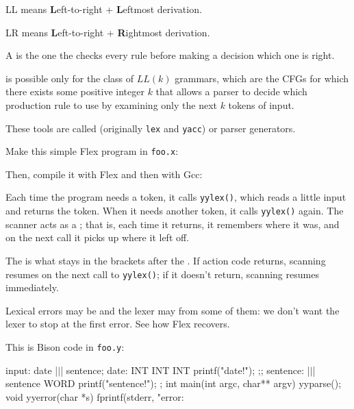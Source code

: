 \documentclass{article}
\begin{document}
LL means \textbf{L}eft-to-right + \textbf{L}eftmost derivation.

LR means \textbf{L}eft-to-right + \textbf{R}ightmost derivation.
\plush{}


A  is the one the checks every rule before making a decision which one is right.

 is possible only for the class of \(LL(k)\) grammars, which are the CFGs for which there exists some positive integer \(k\) that allows a parser to decide which production rule to use by examining only the next \(k\) tokens of input.
\plush{}


These tools are called  (originally \texttt{lex} and \texttt{yacc}) or parser generators.

Make this simple Flex program in \texttt{foo.x}:
Then, compile it with Flex and then with Gcc:
\plush{}

Each time the program needs a token, it calls \texttt{yylex()}, which reads a little input and returns the token. When it needs another token, it calls \texttt{yylex()} again. The scanner acts as a ; that is, each time it returns, it remembers where it was, and on the next call it picks up where it left off.
\plush{}

The  is what stays in the brackets after the . If action code returns, scanning resumes on the next call to \texttt{yylex()}; if it doesn't return, scanning resumes immediately.
\plush{}

Lexical errors may be  and the lexer may  from some of them: we don't want the lexer to stop at the first error. See how Flex recovers.
\plush{}

This is Bison code in \texttt{foo.y}:
\begin{ffcode}
input: date |$\vert$| sentence;
date:
  INT INT INT
  { printf("date!\n"); };;
sentence:
  |$\vert$|
  sentence WORD
  { printf("sentence!\n"); };
int main(int argc, char** argv) {
  yyparse();
}
void yyerror(char *s) {
  fprintf(stderr, "error: %
}
\end{ffcode}
\plush{}
\end{document}
